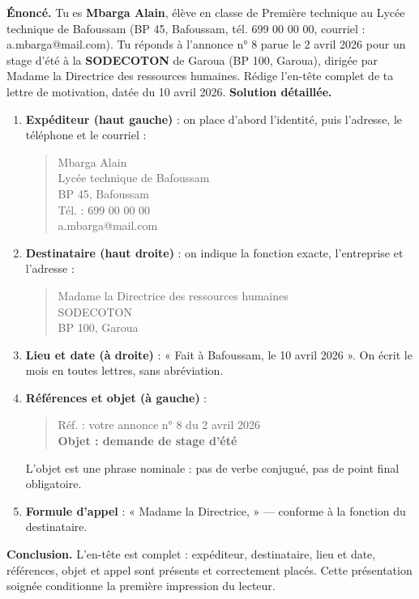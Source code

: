 \documentclass[11pt]{article}
\begin{document}
\begin{exoresolu}
\textbf{Énoncé.} Tu es \textbf{Mbarga Alain}, élève en classe de Première technique au Lycée technique de Bafoussam (BP 45, Bafoussam, tél. 699 00 00 00, courriel : a.mbarga@mail.com). Tu réponds à l'annonce n° 8 parue le 2 avril 2026 pour un stage d'été à la \textbf{SODECOTON} de Garoua (BP 100, Garoua), dirigée par Madame la Directrice des ressources humaines. Rédige l'en-tête complet de ta lettre de motivation, datée du 10 avril 2026.
\tcblower
\textbf{Solution détaillée.}
\begin{enumerate}
\item \textbf{Expéditeur (haut gauche)} : on place d'abord l'identité, puis l'adresse, le téléphone et le courriel :
\begin{quote}
Mbarga Alain\\
Lycée technique de Bafoussam\\
BP 45, Bafoussam\\
Tél. : 699 00 00 00\\
a.mbarga@mail.com
\end{quote}
\item \textbf{Destinataire (haut droite)} : on indique la fonction exacte, l'entreprise et l'adresse :
\begin{quote}
Madame la Directrice des ressources humaines\\
SODECOTON\\
BP 100, Garoua
\end{quote}
\item \textbf{Lieu et date (à droite)} : « Fait à Bafoussam, le 10 avril 2026 ». On écrit le mois en toutes lettres, sans abréviation.
\item \textbf{Références et objet (à gauche)} :
\begin{quote}
Réf. : votre annonce n° 8 du 2 avril 2026\\
\textbf{Objet : demande de stage d'été}
\end{quote}
L'objet est une phrase nominale : pas de verbe conjugué, pas de point final obligatoire.
\item \textbf{Formule d'appel} : « Madame la Directrice, » — conforme à la fonction du destinataire.
\end{enumerate}
\textbf{Conclusion.} L'en-tête est complet : expéditeur, destinataire, lieu et date, références, objet et appel sont présents et correctement placés. Cette présentation soignée conditionne la première impression du lecteur.
\end{exoresolu}
\end{document}
